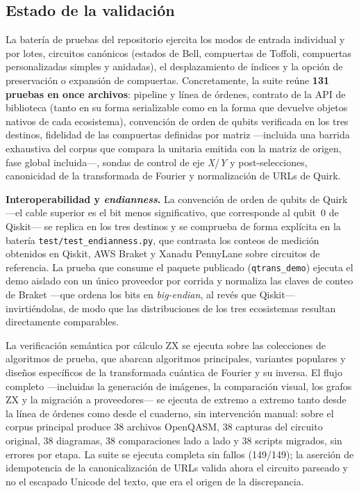\documentclass[11pt,a4paper]{article}
\begin{document}
\subsection{Estado de la validación}

La batería de pruebas del repositorio ejercita los modos de entrada individual y por lotes,
circuitos canónicos (estados de Bell, compuertas de Toffoli, compuertas personalizadas
simples y anidadas), el desplazamiento de índices y la opción de preservación o expansión de
compuertas. Concretamente, la suite reúne \textbf{131 pruebas en once archivos}: pipeline y
línea de órdenes, contrato de la API de biblioteca (tanto en su forma serializable como en la
forma que devuelve objetos nativos de cada ecosistema), convención de orden de qubits
verificada en los tres destinos, fidelidad de las compuertas definidas por matriz ---incluida
una barrida exhaustiva del corpus que compara la unitaria emitida con la matriz de origen,
fase global incluida---, sondas de control de eje \emph{X}/\emph{Y} y post-selecciones,
canonicidad de la transformada de Fourier y normalización de URLs de Quirk.

\textbf{Interoperabilidad y \emph{endianness}.} La convención de orden de qubits de Quirk
---el cable superior es el bit menos significativo, que corresponde al qubit~0 de
Qiskit--- se replica en los tres destinos y se comprueba de forma explícita en la batería
\texttt{test/test\_endianness.py}, que contrasta los conteos de medición obtenidos en Qiskit,
AWS Braket y Xanadu PennyLane sobre circuitos de referencia. La prueba que consume el
paquete publicado (\texttt{qtrans\_demo}) ejecuta el demo aislado con un único proveedor por
corrida y normaliza las claves de conteo de Braket ---que ordena los bits en
\emph{big-endian}, al revés que Qiskit--- invirtiéndolas, de modo que las distribuciones de
los tres ecosistemas resultan directamente comparables.

La verificación semántica por cálculo ZX se ejecuta sobre las colecciones de algoritmos de
prueba, que abarcan algoritmos principales, variantes populares y diseños específicos de la
transformada cuántica de Fourier y su inversa. El flujo completo ---incluidas la generación de
imágenes, la comparación visual, los grafos ZX y la migración a proveedores--- se ejecuta de
extremo a extremo tanto desde la línea de órdenes como desde el cuaderno, sin intervención
manual: sobre el corpus principal produce 38 archivos OpenQASM, 38 capturas del circuito
original, 38 diagramas, 38 comparaciones lado a lado y 38 scripts migrados, sin errores por
etapa. La suite se ejecuta completa sin fallos (149/149); la aserción de idempotencia de la
canonicalización de URLs valida ahora el circuito parseado y no el escapado Unicode del
texto, que era el origen de la discrepancia.
\end{document}
